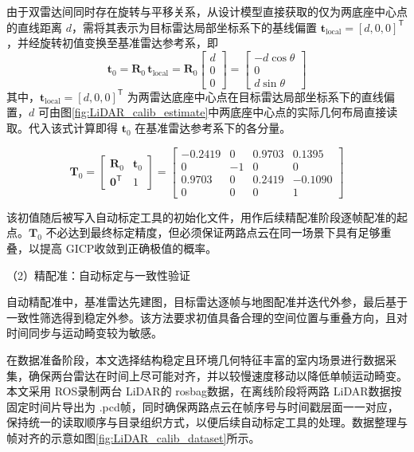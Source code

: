 由于双雷达间同时存在旋转与平移关系，从设计模型直接获取的仅为两底座中心点的直线距离 $d$，需将其表示为目标雷达局部坐标系下的基线偏置 $\mathbf{t}_{\mathrm{local}}=[d,0,0]^{\mathsf{T}}$，并经旋转初值变换至基准雷达参考系，即
\begin{equation}
\label{eq:LiDAR_init_translation}
\mathbf{t}_0=\mathbf{R}_0\,\mathbf{t}_{\mathrm{local}}
=
\mathbf{R}_0
\begin{bmatrix}
d \\ 0 \\ 0
\end{bmatrix}
=
\begin{bmatrix}
-d\cos\theta \\ 0 \\ d\sin\theta
\end{bmatrix}
\end{equation}
其中，$\mathbf{t}_{\mathrm{local}}=[d,0,0]^{\mathsf{T}}$ 为两雷达底座中心点在目标雷达局部坐标系下的直线偏置，$d$ 可由图\ref{fig:LiDAR_calib_estimate}中两底座中心点的实际几何布局直接读取。代入该式计算即得 $\mathbf{t}_0$ 在基准雷达参考系下的各分量。

\begin{equation}
\label{eq:LiDAR_init_guess}
\mathbf{T}_0 =
\begin{bmatrix}
\mathbf{R}_0 & \mathbf{t}_0 \\
\mathbf{0}^{\mathsf{T}} & 1
\end{bmatrix}
=
\begin{bmatrix}
-0.2419 & 0 & 0.9703 & 0.1395 \\
0 & -1 & 0 & 0 \\
0.9703 & 0 & 0.2419 & -0.1090 \\
0 & 0 & 0 & 1
\end{bmatrix}
\end{equation}

该初值随后被写入自动标定工具的初始化文件，用作后续精配准阶段逐帧配准的起点。$\mathbf{T}_0$ 不必达到最终标定精度，但必须保证两路点云在同一场景下具有足够重叠，以提高 GICP收敛到正确极值的概率。

（2）精配准：自动标定与一致性验证

自动精配准中，基准雷达先建图，目标雷达逐帧与地图配准并迭代外参，最后基于一致性筛选得到稳定外参。该方法要求初值具备合理的空间位置与重叠方向，且对时间同步与运动畸变较为敏感。

在数据准备阶段，本文选择结构稳定且环境几何特征丰富的室内场景进行数据采集，确保两台雷达在时间上尽可能对齐，并以较慢速度移动以降低单帧运动畸变。本文采用 ROS录制两台 LiDAR的 rosbag数据，在离线阶段将两路 LiDAR数据按固定时间片导出为 .pcd帧，同时确保两路点云在帧序号与时间戳层面一一对应，保持统一的读取顺序与目录组织方式，以便后续自动标定工具的处理。数据整理与帧对齐的示意如图\ref{fig:LiDAR_calib_dataset}所示。

